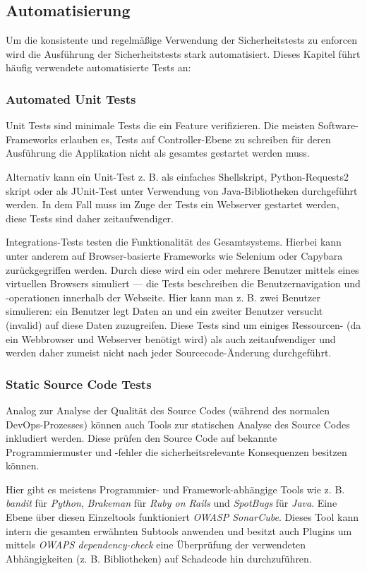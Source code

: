 \subsection{Automatisierung}

Um die konsistente und regelmäßige Verwendung der Sicherheitstests zu enforcen wird die Ausführung der Sicherheitstests stark automatisiert. Dieses Kapitel führt häufig verwendete automatisierte Tests an:

\subsubsection{Automated Unit Tests}

Unit Tests sind minimale Tests die ein Feature verifizieren. Die meisten Software-Frameworks erlauben es, Tests auf Controller-Ebene zu schreiben für deren Ausführung die Applikation nicht als gesamtes gestartet werden muss.

Alternativ kann ein Unit-Test z. B. als einfaches Shellskript, Python-Requests2 skript oder als JUnit-Test unter Verwendung von Java-Bibliotheken durchgeführt werden. In dem Fall muss im Zuge der Tests ein Webserver gestartet werden, diese Tests sind daher zeitaufwendiger.

Integrations-Tests testen die Funktionalität des Gesamtsystems. Hierbei kann unter anderem auf Browser-basierte Frameworks wie Selenium oder Capybara zurückgegriffen werden. Durch diese wird ein oder mehrere Benutzer mittels eines virtuellen Browsers simuliert --- die Tests beschreiben die Benutzernavigation und -operationen innerhalb der Webseite. Hier kann man z. B. zwei Benutzer simulieren: ein Benutzer legt Daten an und ein zweiter Benutzer versucht (invalid) auf diese Daten zuzugreifen. Diese Tests sind um einiges Ressourcen- (da ein Webbrowser und Webserver benötigt wird) als auch zeitaufwendiger und werden daher zumeist nicht nach jeder Sourcecode-Änderung durchgeführt.

\subsubsection{Static Source Code Tests}

Analog zur Analyse der Qualität des Source Codes (während des normalen DevOps-Prozesses) können auch Tools zur statischen Analyse des Source Codes inkludiert werden. Diese prüfen den Source Code auf bekannte Programmiermuster und -fehler die sicherheitsrelevante Konsequenzen besitzen können.

Hier gibt es meistens Programmier- und Framework-abhängige Tools wie z. B. \textit{bandit} für \textit{Python}, \textit{Brakeman} für \textit{Ruby on Rails} und \textit{SpotBugs} für \textit{Java}. Eine Ebene über diesen Einzeltools funktioniert \textit{OWASP SonarCube}. Dieses Tool kann intern die gesamten erwähnten Subtools anwenden und besitzt auch Plugins um mittels \textit{OWAPS dependency-check} eine Überprüfung der verwendeten Abhängigkeiten (z. B. Bibliotheken) auf Schadcode hin durchzuführen.

